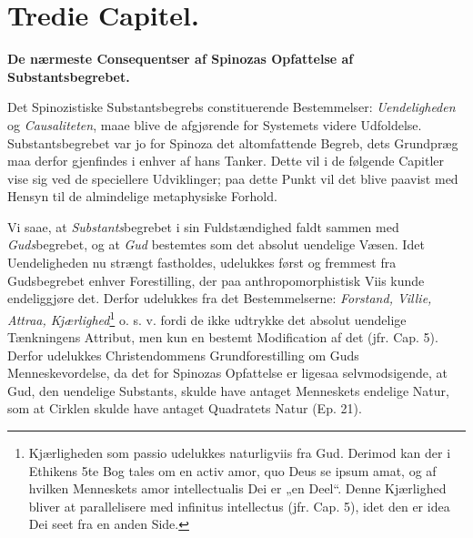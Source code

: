 \documentclass[12pt,a4paper]{book}
\newcommand{\opage}[1]{\marginnote{\footnotesize\textit{[#1]}}}
\begin{document}
\chapter*{Tredie Capitel.}

\begin{center}
\textbf{De nærmeste Consequentser af Spinozas Opfattelse af\\
Substantsbegrebet.}
\end{center}

\opage{65} \setcounter{footnote}{0}%
Det Spinozistiske Substantsbegrebs constituerende Bestemmelser:
\emph{Uendeligheden} og \emph{Causaliteten}, maae blive de afgjørende for
Systemets videre Udfoldelse. Substantsbegrebet var jo for Spinoza
det altomfattende Begreb, dets Grundpræg maa derfor gjenfindes i
enhver af hans Tanker. Dette vil i de følgende Capitler vise sig
ved de speciellere Udviklinger; paa dette Punkt vil det blive
paavist med Hensyn til de almindelige metaphysiske Forhold.

Vi saae, at \emph{Substants}begrebet i sin Fuldstændighed faldt sammen
med \emph{Guds}begrebet, og at \emph{Gud} bestemtes som det absolut uendelige
Væsen. Idet Uendeligheden nu strængt fastholdes, udelukkes først
og fremmest fra Gudsbegrebet enhver Forestilling, der paa
anthropomorphistisk Viis kunde endeliggjøre det. Derfor udelukkes
fra det Bestemmelserne: \emph{Forstand, Villie, Attraa, Kjærlighed}\footnote{Kjærligheden
som passio udelukkes naturligviis fra Gud. Derimod kan der i
Ethikens 5te Bog tales om en activ amor, quo Deus se ipsum amat,
og af hvilken Menneskets amor intellectualis Dei er „en Deel“.
Denne Kjærlighed bliver at parallelisere med infinitus intellectus
(jfr. Cap. 5), idet den er idea Dei seet fra en anden Side.} o.
s. v. fordi de ikke udtrykke det absolut uendelige Tænkningens
Attribut, men kun en bestemt Modification af det (jfr. Cap. 5).
Derfor udelukkes Christendommens Grundforestilling om Guds
Menneskevordelse, da det for Spinozas Opfattelse er ligesaa
selvmodsigende, at Gud, den uendelige Substants, skulde have
antaget Menneskets endelige Natur, som at Cirklen skulde have
antaget Quadratets Natur (Ep. 21).
\end{document}
